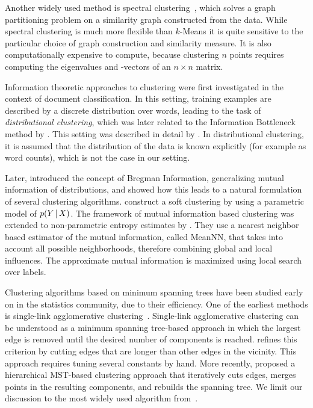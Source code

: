 Another widely used method is spectral clustering~\citep{shi2000normalized,ng2002spectral}, 
which solves a graph partitioning problem on a similarity
graph constructed from the data. While spectral clustering is much more
flexible than $k$-Means it is quite sensitive to the particular choice of graph
construction and similarity measure. It is also computationally expensive to
compute, because clustering $n$ points requires computing the eigenvalues and
-vectors of an $n\times n$ matrix.

Information theoretic approaches to clustering were first investigated in the
context of document classification. In this setting, training examples are
described by a discrete distribution over words, leading to the task of
\emph{distributional clustering}, which was later related to the Information
Bottleneck method by \citep{slonim1999agglomerative}.
This setting was described in detail by \citep{dhillon2003divisive}. In
distributional clustering, it is assumed that the distribution of the data is
known explicitly (for example as word counts), which is not the case in our
setting.

Later, \citet{banerjee2005clustering} introduced the concept of Bregman
Information, generalizing mutual information of distributions, and showed how
this leads to a natural formulation of several clustering algorithms.
%
\citet{barber2006kernelized} construct a soft clustering by using a parametric model of $p(Y\, | \, X)$.
%
The framework of mutual information based clustering was extended to
non-parametric entropy estimates by \citet{faivishevsky2010nonparametric}.
They use a nearest neighbor based estimator of the mutual information, called
MeanNN, that takes into account all possible neighborhoods, therefore combining
global and local influences. The approximate mutual information is maximized
using local search over labels.

Clustering algorithms based on minimum spanning trees have been studied early
on in the statistics community, due to their efficiency.  One of the earliest
methods is single-link agglomerative clustering~\citep{gower1969minimum}.
Single-link agglomerative clustering can be understood as a minimum spanning
tree-based approach in which the largest edge is removed until the desired
number of components is reached.  \citet{zahn1971graph} refines this criterion
by cutting edges that are longer than other edges in the vicinity. This
approach requires tuning several constants by hand. More recently,
\citet{grygorash2006minimum} proposed a hierarchical MST-based clustering
approach that iteratively cuts edges, merges points in the resulting
components, and rebuilds the spanning tree.
We limit our discussion to the most widely used algorithm from~\citep{gower1969minimum}.
%
